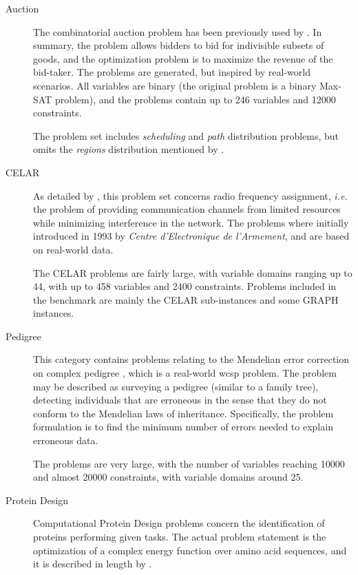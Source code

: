 \begin{description}
	\item[Auction]
		The combinatorial auction problem has been previously used by \textcites{Larrosa08}{Sandholm99}.
		In summary, the problem allows bidders to bid for indivisible subsets of goods, and the optimization problem is to maximize the revenue of the bid-taker.
		The problems are generated, but inspired by real-world scenarios.
		All variables are binary (the original problem is a binary Max-SAT problem), and the problems contain up to \num{246} variables and \num{12000} constraints.

		The problem set includes \emph{scheduling} and \emph{path} distribution problems, but omits the \emph{regions} distribution mentioned by \textcite[\pno~228]{Larrosa08}.

	\item[CELAR]
		As detailed by \textcite{Cabon99} \parencite[and to some extent][\pno~315\psq]{Meseguer06}, this problem set concerns radio frequency assignment, \emph{i.e.} the problem of providing communication channels from limited resources while minimizing interference in the network.
		The problems where initially introduced in 1993 by \emph{Centre d’Electronique de l’Armement}, and are based on real-world data.

		The CELAR problems are fairly large, with variable domains ranging up to \num{44}, with up to \num{458} variables and \num{2400} constraints.
		Problems included in the benchmark are mainly the CELAR sub-instances \parencite[\pno~85]{Cabon99} and some GRAPH instances.

	\item[Pedigree]
		This category contains problems relating to the Mendelian error correction on complex pedigree \parencites{Sanchez08}[\pno~317\psq]{Meseguer06}, which is a real-world \gls{wcsp} problem.
		The problem may be described as surveying a pedigree (similar to a family tree), detecting individuals that are erroneous in the sense that they do not conform to the Mendelian laws of inheritance.
		Specifically, the problem formulation is to find the minimum number of errors needed to explain erroneous data.

		The problems are very large, with the number of variables reaching \num{10000} and almost \num{20000} constraints, with variable domains around \num{25}.

	\item[Protein Design]
		Computational Protein Design problems concern the identification of proteins performing given tasks. The actual problem statement is the optimization of a complex energy function over amino acid sequences, and it is described in length by \textcite{Allouche12}.


\end{description}
